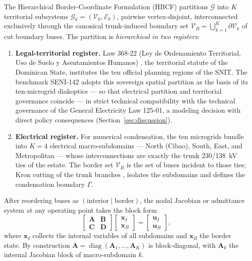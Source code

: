 The Hierarchical Border-Coordinate Formulation (HBCF) partitions $\mathcal{G}$ into $K$ territorial subsystems $\mathcal{G}_k = (\mathcal{V}_k, \mathcal{E}_k)$, pairwise vertex-disjoint, interconnected exclusively through the canonical trunk-induced boundary set $\mathcal{V}_B = \bigcup_{k=1}^{K} \partial \mathcal{V}_k$ of cut boundary buses. The partition is \emph{hierarchical in two registers}:
\begin{enumerate}
\item \textbf{Legal-territorial register.} Law 368-22 (Ley de Ordenamiento Territorial, Uso de Suelo y Asentamientos Humanos) \cite{ley368}, the territorial statute of the Dominican State, institutes the ten official planning regions of the SNIT. The benchmark SENI-142 adopts this sovereign spatial partition as the basis of its ten-microgrid diakoptics --- so that electrical partition and territorial governance coincide --- in strict technical compatibility with the technical governance of the General Electricity Law 125-01, a modeling decision with direct policy consequences (Section~\ref{sec:discussion}).
\item \textbf{Electrical register.} For numerical condensation, the ten microgrids bundle into $K = 4$ electrical macro-subdomains --- North (Cibao), South, East, and Metropolitan --- whose interconnections are exactly the trunk 230/138~kV ties of the estate. The border set $\mathcal{V}_B$ is the set of buses incident to those ties; Kron cutting of the trunk branches \cite{kron1963}, \cite{happ1971} isolates the subdomains and defines the condensation boundary $\Gamma$.
\end{enumerate}

After reordering buses as $(\text{interior} \mid \text{border})$, the nodal Jacobian or admittance system at any operating point takes the block form
\begin{equation}
\begin{bmatrix} \mathbf{A} & \mathbf{B} \\ \mathbf{C} & \mathbf{D} \end{bmatrix} \begin{bmatrix} \mathbf{x}_I \\ \mathbf{x}_B \end{bmatrix} = \begin{bmatrix} \mathbf{u}_I \\ \mathbf{u}_B \end{bmatrix},
\label{eq:blockform}
\end{equation}
where $\mathbf{x}_I$ collects the internal variables of all subdomains and $\mathbf{x}_B$ the border state. By construction $\mathbf{A} = \operatorname{diag}(\mathbf{A}_1, \dots, \mathbf{A}_K)$ is block-diagonal, with $\mathbf{A}_k$ the internal Jacobian block of macro-subdomain $k$.


